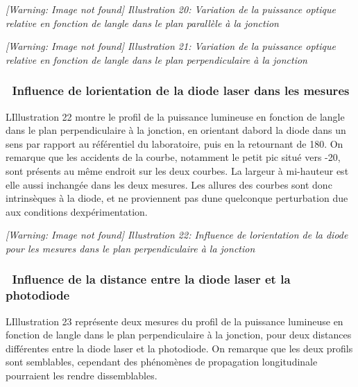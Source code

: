 \documentclass[12pt,twoside]{article}
\begin{document}
\begin{minipage}{15.334cm}
{\itshape
 [Warning: Image not found] Illustration
20\label{seq:refIllustration19}: Variation de la puissance optique
relative en fonction de l{\textquotesingle}angle dans le plan
parall\`ele \`a la jonction}
\end{minipage}

\begin{minipage}{15.334cm}
{\itshape
 [Warning: Image not found] Illustration
21\label{seq:refIllustration20}: Variation de la puissance optique
relative en fonction de l{\textquotesingle}angle dans le plan
perpendiculaire \`a la jonction}
\end{minipage}

\subsubsection[\ Influence de l{\textquotesingle}orientation de la diode
laser dans les mesures]{\ Influence de l{\textquotesingle}orientation
de la diode laser dans les mesures}
L{\textquotesingle}Illustration 22 montre le profil de la puissance
lumineuse en fonction de l{\textquotesingle}angle dans le plan
perpendiculaire \`a la jonction, en orientant d{\textquotesingle}abord
la diode dans un sens par rapport au r\'ef\'erentiel du laboratoire,
puis en la retournant de 180{\textdegree}. On remarque que les
accidents de la courbe, notamment le petit pic situ\'e vers
{}-20{\textdegree}, sont pr\'esents au m\^eme endroit sur les deux
courbes. La largeur \`a mi{}-hauteur est elle aussi inchang\'ee dans
les deux mesures. Les allures des courbes sont donc intrins\`eques \`a
la diode, et ne proviennent pas d{\textquotesingle}une quelconque
perturbation due aux conditions d{\textquotesingle}exp\'erimentation.

\begin{minipage}{15.334cm}
{\itshape
 [Warning: Image not found] Illustration
22\label{seq:refIllustration21}: Influence de
l{\textquotesingle}orientation de la diode pour les mesures dans le
plan perpendiculaire \`a la jonction}
\end{minipage}

\subsubsection[\ Influence de la distance entre la diode laser et la
photodiode]{\ Influence de la distance entre la diode laser et la
photodiode}
L{\textquotesingle}Illustration 23 repr\'esente deux mesures du profil
de la puissance lumineuse en fonction de l{\textquotesingle}angle dans
le plan perpendiculaire \`a la jonction, pour deux distances
diff\'erentes entre la diode laser et la photodiode. On remarque que
les deux profils sont semblables, cependant des ph\'enom\`enes de
propagation longitudinale pourraient les rendre dissemblables. 
\end{document}
